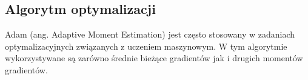 \newpage
\subsection{Algorytm optymalizacji}
Adam (ang. Adaptive Moment Estimation) \cite{adam} jest często stosowany w zadaniach optymalizacyjnych związanych z uczeniem maszynowym.
W tym algorytmie wykorzystywane są zarówno średnie bieżące gradientów jak i drugich momentów gradientów.
